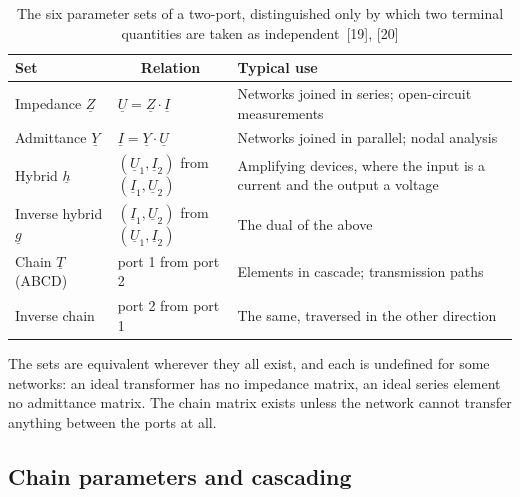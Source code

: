 \begin{table}[!ht]
  \centering
  \begin{tabularx}{\linewidth}{@{}l l X@{}}
    \toprule
    \textbf{Set} & \multicolumn{1}{c}{\textbf{Relation}} & \textbf{Typical use} \\
    \midrule
    Impedance $\underline{Z}$
      & $\underline{U} = \underline{Z} \cdot \underline{I}$
      & Networks joined in series; open-circuit measurements \\
    Admittance $\underline{Y}$
      & $\underline{I} = \underline{Y} \cdot \underline{U}$
      & Networks joined in parallel; nodal analysis \\
    Hybrid $\underline{h}$
      & $\left(\underline{U}_1, \underline{I}_2\right)$ from
        $\left(\underline{I}_1, \underline{U}_2\right)$
      & Amplifying devices, where the input is a current and the output a
        voltage \\
    Inverse hybrid $\underline{g}$
      & $\left(\underline{I}_1, \underline{U}_2\right)$ from
        $\left(\underline{U}_1, \underline{I}_2\right)$
      & The dual of the above \\
    Chain $\underline{T}$ (ABCD)
      & port 1 from port 2
      & Elements in cascade; transmission paths \\
    Inverse chain
      & port 2 from port 1
      & The same, traversed in the other direction \\
    \bottomrule
  \end{tabularx}
  \caption{The six parameter sets of a two-port, distinguished only by which
           two terminal quantities are taken as independent~[19], [20]}
  \label{tab:tp-sets}
\end{table}

The sets are equivalent wherever they all exist, and each is undefined for
some networks: an ideal transformer has no impedance matrix, an ideal
series element no admittance matrix. The chain matrix exists unless the
network cannot transfer anything between the ports at all.

\subsection{Chain parameters and cascading}
\label{sec:tp-chain}

